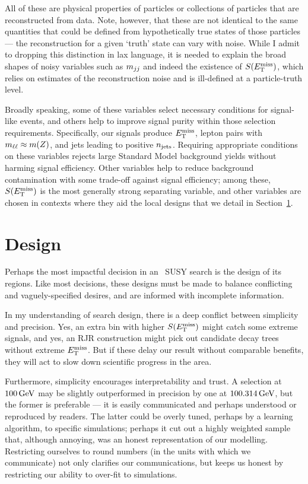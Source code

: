 All of these are physical properties of particles or collections of particles
that are reconstructed from data.
Note, however, that these are not identical to the same quantities that could
be defined from hypothetically true states of those particles ---
the reconstruction for a given `truth' state can vary with noise.
While I admit to dropping this distinction in lax language, it is needed to
explain the broad shapes of noisy variables such as $\mjj$ and indeed the
existence of $\metsig$, which relies on estimates of the reconstruction noise
and is ill-defined at a particle-truth level.

Broadly speaking, some of these variables select necessary conditions for
signal-like events, and others help to improve signal purity within those
selection requirements.
Specifically, our signals produce $\met$, lepton pairs with
$\mll \approx m(Z)$, and jets leading to positive $\njet$.
Requiring appropriate conditions on these variables rejects large
Standard Model background yields without harming signal efficiency.
Other variables help to reduce background contamination with some trade-off
against signal efficiency; among these, $\metsig$ is the most generally strong
separating variable, and other variables are chosen in contexts where
they aid the local designs that we detail in Section~\ref{sec:2ljets_design}.


\FloatBarrier
\section{Design}
\label{sec:2ljets_design}
Perhaps the most impactful decision in an \atlas\ SUSY search is the design of
its regions.
Like most decisions, these designs must be made to balance conflicting and
vaguely-specified desires, and are informed with incomplete information.

In my understanding of search design, there is a deep conflict between
simplicity and precision.
Yes, an extra bin with higher $\metsig$ might catch some extreme signals,
and yes, an RJR construction might pick out candidate decay trees without
extreme $\met$.
But if these delay our result without comparable benefits, they will act to
slow down scientific progress in the area.

Furthermore, simplicity encourages interpretability and trust.
A selection at $100\,\eV[G]$ may be slightly outperformed in precision by one
at $100.314\,\eV[G]$, but the former is preferable --- it is easily
communicated and perhaps understood or reproduced by readers.
The latter could be overly tuned, perhaps by a learning algorithm, to specific
simulations; perhaps it cut out a highly weighted sample that, although
annoying, was an
honest representation of our modelling.
Restricting ourselves to round numbers (in the units with which we communicate)
not only clarifies our communications,
but keeps us honest by restricting our ability to over-fit to simulations.

